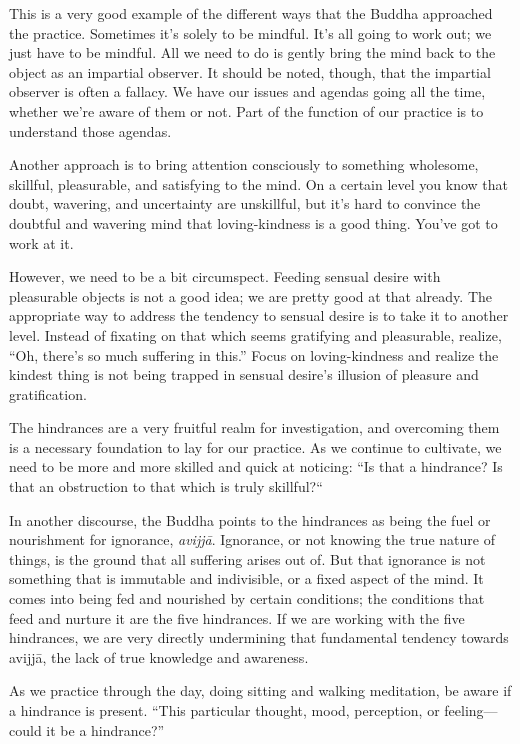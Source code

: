 This is a very good example of the different ways that the Buddha
approached the practice. Sometimes it’s solely to be mindful. It’s all
going to work out; we just have to be mindful. All we need to do is
gently bring the mind back to the object as an impartial observer. It
should be noted, though, that the impartial observer is often a fallacy.
We have our issues and agendas going all the time, whether we’re aware
of them or not. Part of the function of our practice is to understand
those agendas.

Another approach is to bring attention consciously to something
wholesome, skillful, pleasurable, and satisfying to the mind. On a
certain level you know that doubt, wavering, and uncertainty are
unskillful, but it’s hard to convince the doubtful and wavering mind
that loving-kindness is a good thing. You’ve got to work at it.

However, we need to be a bit circumspect. Feeding sensual desire with
pleasurable objects is not a good idea; we are pretty good at that
already. The appropriate way to address the tendency to sensual desire
is to take it to another level. Instead of fixating on that which seems
gratifying and pleasurable, realize, “Oh, there’s so much suffering in
this.” Focus on loving-kindness and realize the kindest thing is not
being trapped in sensual desire’s illusion of pleasure and
gratification.

The hindrances are a very fruitful realm for investigation, and
overcoming them is a necessary foundation to lay for our practice. As we
continue to cultivate, we need to be more and more skilled and quick at
noticing: “Is that a hindrance? Is that an obstruction to that which is
truly skillful?“

In another discourse, the Buddha points to the hindrances as being the
fuel or nourishment for ignorance, \emph{avijjā}. Ignorance, or not
knowing the true nature of things, is the ground that all suffering
arises out of. But that ignorance is not something that is immutable and
indivisible, or a fixed aspect of the mind. It comes into being fed and
nourished by certain conditions; the conditions that feed and nurture it
are the five hindrances. If we are working with the five hindrances, we
are very directly undermining that fundamental tendency towards avijjā,
the lack of true knowledge and awareness.

As we practice through the day, doing sitting and walking meditation, be
aware if a hindrance is present. “This particular thought, mood,
perception, or feeling—could it be a hindrance?”

